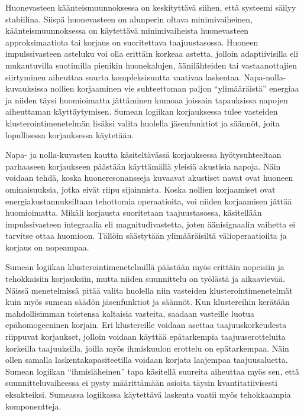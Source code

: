 \documentclass[finnish,12pt]{article}
\begin{document}
Huonevasteen käänteismuunnoksessa on keskityttävä siihen, että systeemi säilyy stabiilina. Siispä huonevasteen on alunperin oltava minimivaiheinen, käänteismuunnoksessa on käytettävä minimivaiheista huonevasteen approksimaatiota tai korjaus on suoritettava taajuustasossa. Huoneen impulssivasteen asteluku voi olla erittäin korkeaa astetta, jolloin adaptiivisilla eli mukautuvilla suotimilla pienikin huonekalujen, äänilähteiden tai vastaanottajien siirtyminen aiheuttaa suurta kompleksisuutta vaativaa laskentaa. Napa-nolla-kuvauksissa nollien korjaaminen vie suhteettoman paljon ``ylimääräistä'' energiaa ja niiden täysi huomioimatta jättäminen kumoaa joissain tapauksissa napojen aiheuttaman käyttäytymisen. Sumean logiikan korjauksessa tulee vasteiden klusterointimenetelmän lisäksi valita huolella jäsenfunktiot ja säännöt, joita lopullisessa korjauksessa käytetään.

Napa- ja nolla-kuvasten kautta käsiteltävässä korjauksessa hyötysuhteeltaan parhaaseen korjaukseen päästään käyttämällä yleisiä akustisia napoja. Näin voidaan tehdä, koska huoneresonansseja kuvaavat akustiset navat ovat huoneen ominaisuuksia, jotka eivät riipu sijainnista. Koska nollien korjaamiset ovat energiakustannuksiltaan tehottomia operaatioita, voi niiden korjaamisen jättää huomioimatta. Mikäli korjausta suoritetaan taajuustasossa, käsitellään impulssivasteen integraalia eli magnitudivastetta, joten äänisignaalin vaihetta ei tarvitse ottaa huomioon. Tällöin säästytään ylimääräisiltä välioperaatioilta ja korjaus on nopeampaa.

Sumean logiikan klusterointimenetelmillä päästään myös erittäin nopeisiin ja tehokkaisiin korjauksiin, mutta niiden suunnittelu on työlästä ja aikaavievää. Näissä menetelmissä pitää valita huolella niin vasteiden klusterointimenetelmät kuin myös sumean säädön jäsenfunktiot ja säännöt. Kun klustereihin kerätään mahdollisimman toistensa kaltaisia vasteita, saadaan vasteille luotua epähomogeeninen korjain. Eri klustereille voidaan asettaa taajuuskorkeudesta riippuvat korjaukset, jolloin voidaan käyttää epätarkempia taajuuserotteluita korkeilla taajuuksilla, joilla myös ihmiskuulon erottelu on epätarkempaa. Näin ollen samalla laskentakapasiteetilla voidaan korjata laajempaa taajuusaluetta. Sumean logiikan ``ihmisläheinen'' tapa käsitellä suureita aiheuttaa myös sen, että suunnitteluvaiheessa ei pysty määrittämään asioita täysin kvantitatiivisesti eksakteiksi. Sumeassa logiikassa käytettävä laskenta vaatii myös tehokkaampia komponentteja.
\end{document}
